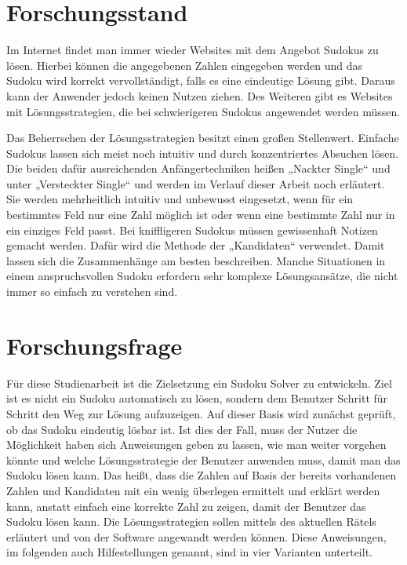 \section{Forschungsstand}
Im Internet findet man immer wieder Websites mit dem Angebot Sudokus zu lösen. Hierbei können die angegebenen Zahlen eingegeben werden und das Sudoku wird korrekt vervollständigt, falls es eine eindeutige Lösung gibt. Daraus kann der Anwender jedoch keinen Nutzen ziehen. Des Weiteren gibt es Websites mit Lösungsstrategien, die bei schwierigeren Sudokus angewendet werden müssen.

Das Beherrschen der Lösungsstrategien besitzt einen großen Stellenwert. Einfache Sudokus lassen sich meist noch intuitiv und durch konzentriertes Absuchen lösen. Die beiden dafür ausreichenden Anfängertechniken heißen „Nackter Single“ und unter „Versteckter Single“ und werden im Verlauf dieser Arbeit noch erläutert. Sie werden mehrheitlich intuitiv und unbewusst eingesetzt, wenn für ein bestimmtes Feld nur eine Zahl möglich ist oder wenn eine bestimmte Zahl nur in ein einziges Feld passt. Bei kniffligeren Sudokus müssen gewissenhaft Notizen gemacht werden. Dafür wird die Methode der „Kandidaten“ verwendet. Damit lassen sich die Zusammenhänge am besten beschreiben. Manche Situationen in einem anspruchsvollen Sudoku erfordern sehr komplexe Lösungsansätze, die nicht immer so einfach zu verstehen sind. 


\section{Forschungsfrage}
Für diese Studienarbeit ist die Zielsetzung ein Sudoku Solver zu entwickeln. Ziel ist es nicht ein Sudoku automatisch zu lösen, sondern dem Benutzer Schritt für Schritt den Weg zur Lösung aufzuzeigen. Auf dieser Basis wird zunächst geprüft, ob das Sudoku eindeutig lösbar ist. Ist dies der Fall, muss der Nutzer die Möglichkeit haben sich Anweisungen geben zu lassen, wie man weiter vorgehen könnte und welche Lösungsstrategie der Benutzer anwenden muss, damit man das Sudoku lösen kann. Das heißt, dass die Zahlen auf Basis der bereits vorhandenen Zahlen und Kandidaten mit ein wenig überlegen ermittelt und erklärt werden kann, anstatt einfach eine korrekte Zahl zu zeigen, damit der Benutzer das Sudoku lösen kann. Die Lösungsstrategien sollen mittels des aktuellen Rätels erläutert und von der Software angewandt werden können. Diese Anweisungen, im folgenden auch Hilfestellungen genannt, sind in vier Varianten unterteilt.

